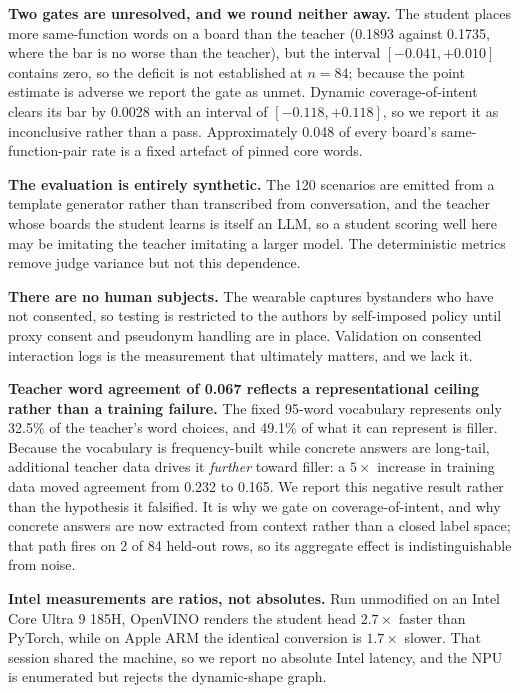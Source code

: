 \textbf{Two gates are unresolved, and we round neither away.} The student places
more same-function words on a board than the teacher (0.1893 against 0.1735,
where the bar is no worse than the teacher), but the interval $[-0.041, +0.010]$
contains zero, so the deficit is not established at $n{=}84$; because the point
estimate is adverse we report the gate as unmet. Dynamic coverage-of-intent
clears its bar by 0.0028 with an interval of $[-0.118, +0.118]$, so we report it
as inconclusive rather than a pass. Approximately 0.048 of every board's
same-function-pair rate is a fixed artefact of pinned core words.

\textbf{The evaluation is entirely synthetic.} The 120 scenarios are emitted from
a template generator rather than transcribed from conversation, and the teacher
whose boards the student learns is itself an LLM, so a student scoring well here
may be imitating the teacher imitating a larger model. The deterministic metrics
remove judge variance but not this dependence.

\textbf{There are no human subjects.} The wearable captures bystanders who have
not consented, so testing is restricted to the authors by self-imposed policy
until proxy consent and pseudonym handling are in place. Validation on consented
interaction logs is the measurement that ultimately matters, and we lack it.

\textbf{Teacher word agreement of 0.067 reflects a representational ceiling
rather than a training failure.} The fixed 95-word vocabulary represents only
32.5\% of the teacher's word choices, and 49.1\% of what it can represent is
filler. Because the vocabulary is frequency-built while concrete answers are
long-tail, additional teacher data drives it \emph{further} toward filler: a
$5\times$ increase in training data moved agreement from 0.232 to 0.165. We
report this negative result rather than the hypothesis it falsified. It is why we
gate on coverage-of-intent, and why concrete answers are now extracted from
context rather than a closed label space; that path fires on 2 of 84 held-out
rows, so its aggregate effect is indistinguishable from noise.

\textbf{Intel measurements are ratios, not absolutes.} Run unmodified on an Intel
Core Ultra 9 185H, OpenVINO renders the student head $2.7\times$ faster than
PyTorch, while on Apple ARM the identical conversion is $1.7\times$ slower. That
session shared the machine, so we report no absolute Intel latency, and the NPU
is enumerated but rejects the dynamic-shape graph.

